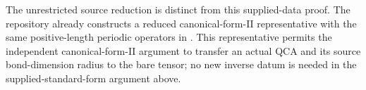 \documentclass[11pt]{article}
\begin{document}
The unrestricted source reduction is distinct from this supplied-data
proof. The repository already constructs a reduced canonical-form-II
representative with the same positive-length periodic operators in
. This
representative permits the independent canonical-form-II argument to
transfer an actual QCA and its source bond-dimension radius to the bare
tensor; no new inverse datum is needed in the supplied-standard-form
argument above.



\end{document}

